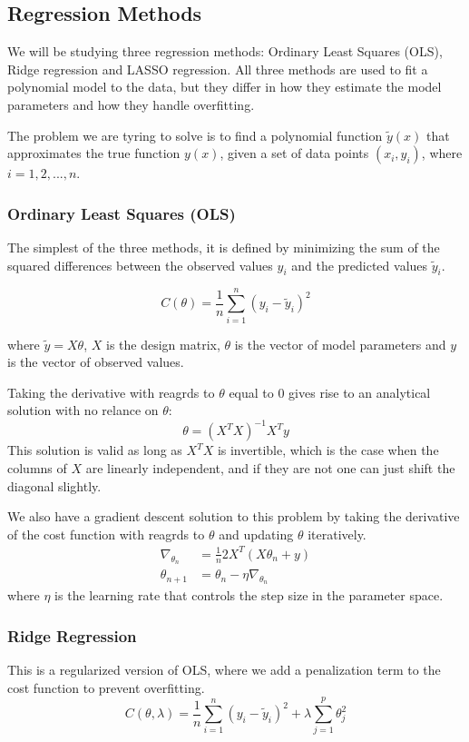 \documentclass[amssymb,twocolumn,aps]{revtex4}
\begin{document}
\subsection{Regression Methods}
We will be studying three regression methods: Ordinary Least Squares (OLS), Ridge regression and LASSO regression.
All three methods are used to fit a polynomial model to the data, but they differ in how they estimate the model parameters and how they handle overfitting.

The problem we are tyring to solve is to find a polynomial function $\tilde{y}(x)$ that approximates the true function $y(x)$, given a set of data points $(x_i, y_i)$, where $i=1,2,...,n$.

\subsubsection{Ordinary Least Squares (OLS)}
The simplest of the three methods, it is defined by minimizing the sum of the squared differences between the observed values $y_i$ and the predicted values $\tilde{y}_i$.

$$C(\theta) = \frac{1}{n} \sum_{i=1}^{n} (y_i - \tilde{y}_i)^2$$

where $\tilde{y} = X\theta$, $X$ is the design matrix, $\theta$ is the vector of model parameters and $y$ is the vector of observed values.

Taking the derivative with reagrds to $\theta$ equal to $0$ gives rise to an analytical solution with no relance on $\theta$:
\begin{equation}
  \theta = (X^TX)^{-1}X^Ty  
\end{equation}
This solution is valid as long as $X^TX$ is invertible, which is the case when the columns of $X$ are linearly independent, and if they are not one can just shift the diagonal slightly.

We also have a gradient descent solution to this problem by taking the derivative of the cost function with reagrds to $\theta$ and updating $\theta$ iteratively.
\begin{align}
\nabla_{\theta_n} &= \frac{1}{n}2X^T(X\theta_n + y) \\
\theta_{n+1} &= \theta_n - \eta \nabla_{\theta_n}
\end{align}
where $\eta$ is the learning rate that controls the step size in the parameter space.

\subsubsection{Ridge Regression}
This is a regularized version of OLS, where we add a penalization term to the cost function to prevent overfitting.
\begin{equation}
    C(\theta, \lambda) = \frac{1}{n} \sum_{i=1}^{n} (y_i - \tilde{y}_i)^2 + \lambda \sum_{j=1}^{p} \theta_j^2
\end{equation}
\end{document}
